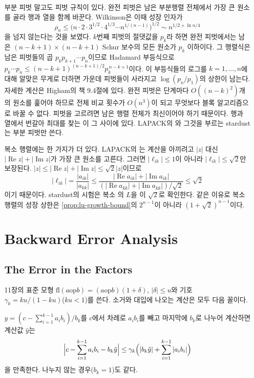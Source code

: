 부분 피벗 말고도 피벗 규칙이 있다. 완전 피벗은 남은 부분행렬 전체에서 가장 큰 원소를 골라 행과 열을 함께 바꾼다. Wilkinson은 이때 성장 인자가
\[
\rho_n\le\bigl(n\cdot2\cdot3^{1/2}\cdot4^{1/3}\cdots n^{1/(n-1)}\bigr)^{1/2}\sim n^{1/2+\ln n/4}
\]
을 넘지 않는다는 것을 보였다\cite{wilkinson1961error}. $k$번째 피벗의 절댓값을 $p_k$라 하면 완전 피벗에서는 남은 $(n-k+1)\times(n-k+1)$ Schur 보수의 모든 원소가 $p_k$ 이하이다. 그 행렬식은 남은 피벗들의 곱 $p_kp_{k+1}\cdots p_n$이므로 Hadamard 부등식으로 $p_k\cdots p_n\le(n-k+1)^{(n-k+1)/2}p_k^{\,n-k+1}$이다. 이 부등식들의 로그를 $k=1,\dots,n$에 대해 알맞은 무게로 더하면 가운데 피벗들이 사라지고 $\log(p_n/p_1)$의 상한이 남는다. 자세한 계산은 Higham의 책 9.4절에 있다\cite{higham2002accuracy}. 완전 피벗은 단계마다 $O((n-k)^2)$개의 원소를 훑어야 하므로 전체 비교 횟수가 $O(n^3)$이 되고 무엇보다 블록 알고리즘으로 바꿀 수 없다. 피벗을 고르려면 남은 행렬 전체가 최신이어야 하기 때문이다. 행과 열에서 번갈아 최대를 찾는 이 그 사이에 있다. LAPACK의 와 그것을 부르는 stardust는 부분 피벗만 쓴다.

복소 행렬에는 한 가지가 더 있다. LAPACK의 는 계산을 아끼려고 $|z|$ 대신 $|\operatorname{Re}z|+|\operatorname{Im}z|$가 가장 큰 원소를 고른다. 그러면 $|\ell_{ik}|\le1$이 아니라 $|\ell_{ik}|\le\sqrt2$만 보장된다. $|z|\le|\operatorname{Re}z|+|\operatorname{Im}z|\le\sqrt2|z|$이므로
\[
|\ell_{ik}|=\frac{|a_{ik}|}{|a_{kk}|}\le\frac{|\operatorname{Re}a_{ik}|+|\operatorname{Im}a_{ik}|}{(|\operatorname{Re}a_{kk}|+|\operatorname{Im}a_{kk}|)/\sqrt2}\le\sqrt2
\]
이기 때문이다. stardust의 시험은 복소 의 $L$을 이 $\sqrt2$로 확인한다. 같은 이유로 복소 행렬의 성장 상한은 \cref{prop:lu-growth-bound}의 $2^{n-1}$이 아니라 $(1+\sqrt2)^{n-1}$이다.

\section{Backward Error Analysis}
\label{sec:lu-backward-error}

\subsection{The Error in the Factors}

11장의 표준 모형 $\mathrm{fl}(a\mathbin{\mathrm{op}}b)=(a\mathbin{\mathrm{op}}b)(1+\delta)$, $|\delta|\le u$와 기호 $\gamma_k=ku/(1-ku)$($ku<1$)를 쓴다. 소거와 대입에 나오는 계산은 모두 다음 꼴이다.

\begin{lemma}
\label{lem:lu-recurrence}
$y=(c-\sum_{i=1}^{k-1}a_ib_i)/b_k$를 $c$에서 차례로 $a_ib_i$를 빼고 마지막에 $b_k$로 나누어 계산하면 계산값 $\hat y$는
\[
\Bigl|c-\sum_{i=1}^{k-1}a_ib_i-b_k\hat y\Bigr|\le\gamma_k\Bigl(|b_k\hat y|+\sum_{i=1}^{k-1}|a_ib_i|\Bigr)
\]
을 만족한다. 나누지 않는 경우($b_k=1$)도 같다.
\end{lemma}

